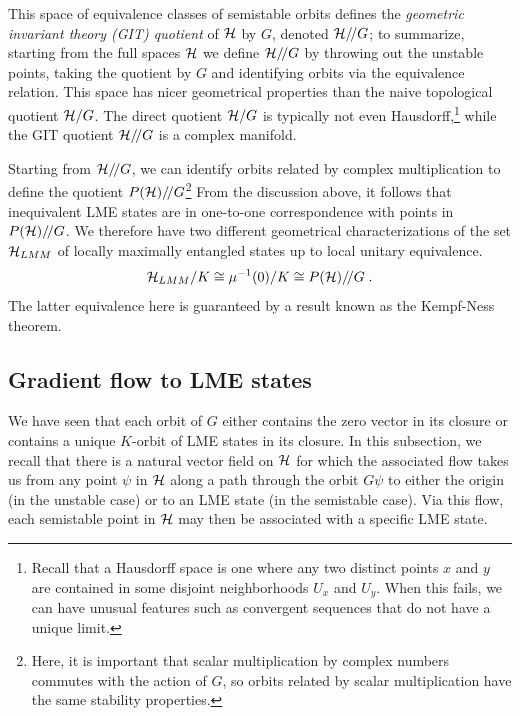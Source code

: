 \documentclass[12pt]{article}
\theoremstyle{definition}
\newcommand{\be}{\begin{equation}}
\newcommand{\ee}{\end{equation}}
\newcommand{\GITquot}{/\!/}
\begin{document}
This space of equivalence classes of semistable orbits defines the {\it geometric invariant theory (GIT) quotient} of ${\cal H}$ by $G$, denoted ${\cal H}\GITquot G$; to summarize, starting from the full spaces ${\cal H}$ we define ${\cal H}\GITquot G$ by throwing out the unstable points, taking the quotient by $G$ and identifying orbits via the equivalence relation. This space has nicer geometrical properties than the naive topological quotient ${\cal H}/G$. The direct quotient ${\cal H}/G$ is typically not even Hausdorff,\footnote{Recall that a Hausdorff space is one where any two distinct points $x$ and $y$ are contained in some disjoint neighborhoods $U_x$ and $U_y$. When this fails, we can have unusual features such as convergent sequences that do not have a unique limit.} while the GIT quotient ${\cal H}\GITquot G$ is a complex manifold.

Starting from ${\cal H}\GITquot G$, we can identify orbits related by complex multiplication to define the quotient $P({\cal H})\GITquot G$\footnote{Here, it is important that scalar multiplication by complex numbers commutes with the action of $G$, so orbits related by scalar multiplication have the same stability properties.} From the discussion above, it follows that inequivalent LME states are in one-to-one correspondence with points in $P({\cal H})\GITquot G$. We therefore have two different geometrical characterizations of the set ${\cal H}_{LMM}$ of locally maximally entangled states up to local unitary equivalence.
\be
{\cal H}_{LMM}/K \cong \mu^{-1}(0)/K \cong P({\cal H})\GITquot G \; .
\ee
The latter equivalence here is guaranteed by a result known as the Kempf-Ness theorem.

\subsection{Gradient flow to LME states}

We have seen that each orbit of $G$ either contains the zero vector in its closure or contains a unique $K$-orbit of LME states in its closure. In this subsection, we recall that there is a natural vector field on ${\cal H}$ for which the associated flow takes us from any point $\psi$ in ${\cal H}$ along a path through the orbit $G \psi$ to either the origin (in the unstable case) or to an LME state (in the semistable case). Via this flow, each semistable point in ${\cal H}$ may then be associated with a specific LME state.
\end{document}
